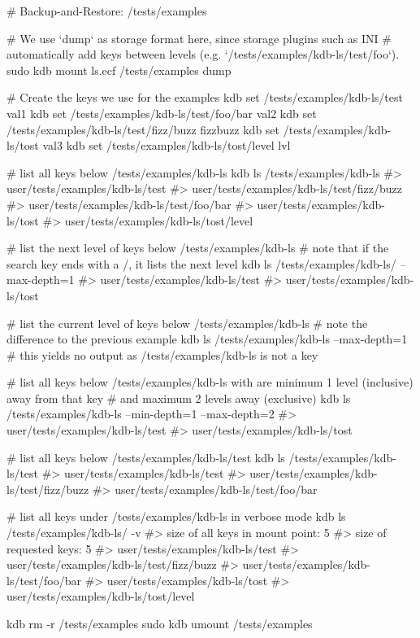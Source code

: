 \begin{DoxyCode}
# Backup-and-Restore: /tests/examples

# We use `dump` as storage format here, since storage plugins such as INI
# automatically add keys between levels (e.g. `/tests/examples/kdb-ls/test/foo`).
sudo kdb mount ls.ecf /tests/examples dump

# Create the keys we use for the examples
kdb set /tests/examples/kdb-ls/test val1
kdb set /tests/examples/kdb-ls/test/foo/bar val2
kdb set /tests/examples/kdb-ls/test/fizz/buzz fizzbuzz
kdb set /tests/examples/kdb-ls/tost val3
kdb set /tests/examples/kdb-ls/tost/level lvl

# list all keys below /tests/examples/kdb-ls
kdb ls /tests/examples/kdb-ls
#> user/tests/examples/kdb-ls/test
#> user/tests/examples/kdb-ls/test/fizz/buzz
#> user/tests/examples/kdb-ls/test/foo/bar
#> user/tests/examples/kdb-ls/tost
#> user/tests/examples/kdb-ls/tost/level

# list the next level of keys below /tests/examples/kdb-ls
# note that if the search key ends with a /, it lists the next level
kdb ls /tests/examples/kdb-ls/ --max-depth=1
#> user/tests/examples/kdb-ls/test
#> user/tests/examples/kdb-ls/tost

# list the current level of keys below /tests/examples/kdb-ls
# note the difference to the previous example
kdb ls /tests/examples/kdb-ls --max-depth=1
# this yields no output as /tests/examples/kdb-ls is not a key

# list all keys below /tests/examples/kdb-ls with are minimum 1 level (inclusive) away from that key
# and maximum 2 levels away (exclusive)
kdb ls /tests/examples/kdb-ls --min-depth=1 --max-depth=2
#> user/tests/examples/kdb-ls/test
#> user/tests/examples/kdb-ls/tost

# list all keys below /tests/examples/kdb-ls/test
kdb ls /tests/examples/kdb-ls/test
#> user/tests/examples/kdb-ls/test
#> user/tests/examples/kdb-ls/test/fizz/buzz
#> user/tests/examples/kdb-ls/test/foo/bar

# list all keys under /tests/examples/kdb-ls in verbose mode
kdb ls /tests/examples/kdb-ls/ -v
#> size of all keys in mount point: 5
#> size of requested keys: 5
#> user/tests/examples/kdb-ls/test
#> user/tests/examples/kdb-ls/test/fizz/buzz
#> user/tests/examples/kdb-ls/test/foo/bar
#> user/tests/examples/kdb-ls/tost
#> user/tests/examples/kdb-ls/tost/level

kdb rm -r /tests/examples
sudo kdb umount /tests/examples
\end{DoxyCode}


